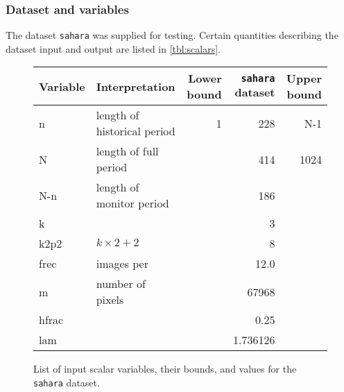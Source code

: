     

\subsubsection{Dataset and variables}

The dataset \texttt{sahara} was supplied for testing. Certain quantities
describing the dataset input and output are listed in \autoref{tbl:scalars}.


\begin{figure}[H]
    \centering
    \begin{tabular}{l l r r r}
    \textbf{Variable} & \textbf{Interpretation}              & \textbf{Lower bound} & \textbf{\texttt{sahara} dataset} & \textbf{Upper bound} \\ \hline
        n                & length of historical period & 1           & 228                     & N-1 \\
        N                & length of full period       &             & 414                     & 1024   \\
        N-n              & length of monitor period    &             & 186                     & \\
        k                &                             &             & 3                       & \\
        k2p2             & \(k\times2 + 2\)            &             & 8                       & \\
        frec             & images per                  &             & 12.0                    & \\
        m                & number of pixels            &             & 67968                   & \\
        hfrac            &                             &             & 0.25                    & \\
        lam              &                             &             & 1.736126                &
    \end{tabular}
    \caption{List of input scalar variables, their bounds, and values for the \texttt{sahara} dataset.}
    \label{tbl:scalars}
\end{figure}
